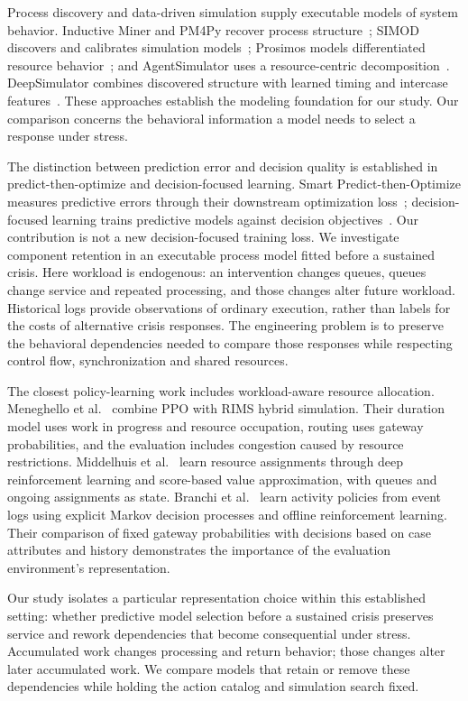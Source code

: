 Process discovery and data-driven simulation supply executable models of system behavior. Inductive Miner and PM4Py recover process structure~\cite{inductive,pm4py}; SIMOD discovers and calibrates simulation models~\cite{simod}; Prosimos models differentiated resource behavior~\cite{prosimos}; and AgentSimulator uses a resource-centric decomposition~\cite{agents}. DeepSimulator combines discovered structure with learned timing and intercase features~\cite{deepsimulator}. These approaches establish the modeling foundation for our study. Our comparison concerns the behavioral information a model needs to select a response under stress.

The distinction between prediction error and decision quality is established in predict-then-optimize and decision-focused learning. Smart Predict-then-Optimize measures predictive errors through their downstream optimization loss~\cite{spo}; decision-focused learning trains predictive models against decision objectives~\cite{dflsurvey}. Our contribution is not a new decision-focused training loss. We investigate component retention in an executable process model fitted before a sustained crisis. Here workload is endogenous: an intervention changes queues, queues change service and repeated processing, and those changes alter future workload. Historical logs provide observations of ordinary execution, rather than labels for the costs of alternative crisis responses. The engineering problem is to preserve the behavioral dependencies needed to compare those responses while respecting control flow, synchronization and shared resources.

The closest policy-learning work includes workload-aware resource allocation. Meneghello et al.~\cite{hybridpolicy} combine PPO with RIMS hybrid simulation. Their duration model uses work in progress and resource occupation, routing uses gateway probabilities, and the evaluation includes congestion caused by resource restrictions. Middelhuis et al.~\cite{resourcepolicy} learn resource assignments through deep reinforcement learning and score-based value approximation, with queues and ongoing assignments as state. Branchi et al.~\cite{rlpolicies} learn activity policies from event logs using explicit Markov decision processes and offline reinforcement learning. Their comparison of fixed gateway probabilities with decisions based on case attributes and history demonstrates the importance of the evaluation environment's representation.

Our study isolates a particular representation choice within this established setting: whether predictive model selection before a sustained crisis preserves service and rework dependencies that become consequential under stress. Accumulated work changes processing and return behavior; those changes alter later accumulated work. We compare models that retain or remove these dependencies while holding the action catalog and simulation search fixed.

